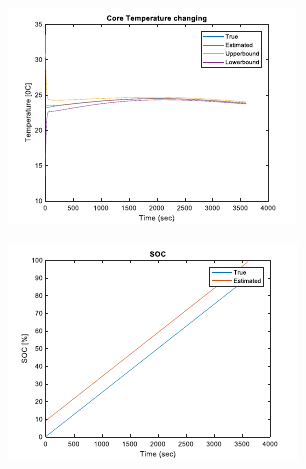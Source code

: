 \documentclass[12pt]{article}
\begin{document}
\begin{figure}[H]
\begin{subfigure}[t]{0.3\linewidth}
	\end{subfigure}	
	\begin{subfigure}[t]{0.3\linewidth}
		\includegraphics[width=\linewidth]{figures/estTempIni3.pdf}
	\end{subfigure}
	\begin{subfigure}[t]{0.3\linewidth}
		\includegraphics[width=\linewidth]{figures/estTempIni4.pdf}
	\end{subfigure}	
	\begin{subfigure}[t]{0.3\linewidth}

\end{subfigure}
\end{figure}
\end{document}

